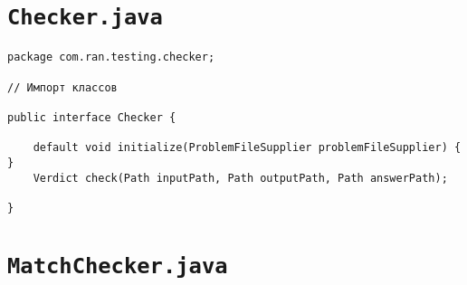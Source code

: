 \section*{\texttt{Checker.java}}
\begin{verbatim}
package com.ran.testing.checker;

// Импорт классов

public interface Checker {

    default void initialize(ProblemFileSupplier problemFileSupplier) { }
    Verdict check(Path inputPath, Path outputPath, Path answerPath);

}
\end{verbatim}

\section*{\texttt{MatchChecker.java}}
